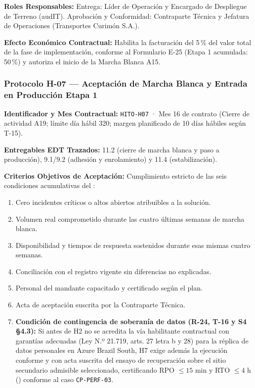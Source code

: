 \par\noindent\textbf{Roles Responsables:} Entrega: Líder de Operación y Encargado de Despliegue de Terreno (audIT). Aprobación y Conformidad: Contraparte Técnica y Jefatura de Operaciones (Transportes Curimón S.A.).\par
\par\noindent\textbf{Efecto Económico Contractual:} Habilita la facturación del 5\,\% del valor total de la fase de implementación, conforme al Formulario E-25 (Etapa 1 acumulada: 50\,\%) y autoriza el inicio de la Marcha Blanca A15.\par

\subsubsection*{Protocolo H-07 — Aceptación de Marcha Blanca y Entrada en Producción Etapa 1}\label{sec:9-proto-h7}
\par\noindent\textbf{Identificador y Mes Contractual:} \texttt{HITO-H07} · Mes 16 de contrato (Cierre de actividad A19; límite día hábil 320; margen planificado de 10 días hábiles según T-15).\par
\par\noindent\textbf{Entregables EDT Trazados:} 11.2 (cierre de marcha blanca y paso a producción), 9.1/9.2 (adhesión y enrolamiento) y 11.4 (estabilización).\par
\par\noindent\textbf{Criterios Objetivos de Aceptación:} Cumplimiento estricto de las seis condiciones acumulativas del :
\begin{enumerate}
  \item Cero incidentes críticos o altos abiertos atribuibles a la solución.
  \item Volumen real comprometido durante las cuatro últimas semanas de marcha blanca.
  \item Disponibilidad y tiempos de respuesta sostenidos durante esas mismas cuatro semanas.
  \item Conciliación con el registro vigente sin diferencias no explicadas.
  \item Personal del mandante capacitado y certificado según el plan.
  \item Acta de aceptación suscrita por la Contraparte Técnica.
  \item \textbf{Condición de contingencia de soberanía de datos (R-24, T-16 y S4 §4.3):} Si antes de H2 no se acredita la vía habilitante contractual con garantías adecuadas (Ley N.º 21.719, arts. 27 letra b y 28) para la réplica de datos personales en Azure Brazil South, H7 exige además la ejecución conforme y con acta suscrita del ensayo de recuperación sobre el sitio secundario admisible seleccionado, certificando RPO $\le 15\text{ min}$ y RTO $\le 4\text{ h}$ () conforme al caso \texttt{CP-PERF-03}.
\end{enumerate}
